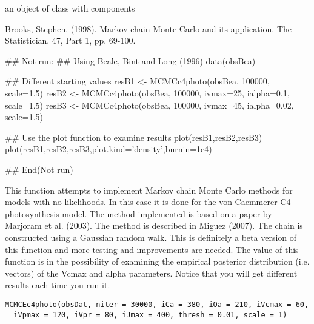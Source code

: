 \documentclass[letterpaper]{book}
\begin{document}
%
\begin{Value}
an object of class  with components
\end{Value}
%
\begin{References}\relax
Brooks, Stephen. (1998). Markov chain Monte Carlo and its
application. The Statistician. 47, Part 1, pp. 69-100.
\end{References}
%
\begin{Examples}
\begin{ExampleCode}
## Not run: 
## Using Beale, Bint and Long (1996)
data(obsBea)

## Different starting values
resB1 <- MCMCc4photo(obsBea, 100000, scale=1.5)
resB2 <- MCMCc4photo(obsBea, 100000, ivmax=25, ialpha=0.1, scale=1.5)
resB3 <- MCMCc4photo(obsBea, 100000, ivmax=45, ialpha=0.02, scale=1.5)

## Use the plot function to examine results
plot(resB1,resB2,resB3)
plot(resB1,resB2,resB3,plot.kind='density',burnin=1e4)


## End(Not run)
\end{ExampleCode}
\end{Examples}
%
\begin{Description}\relax
This function attempts to implement Markov chain Monte
Carlo methods for models with no likelihoods. In this case
it is done for the von Caemmerer C4 photosynthesis model.
The method implemented is based on a paper by Marjoram et
al. (2003).  The method is described in Miguez (2007). The
chain is constructed using a Gaussian random walk. This is
definitely a beta version of this function and more testing
and improvements are needed. The value of this function is
in the possibility of examining the empirical posterior
distribution (i.e. vectors) of the Vcmax and alpha
parameters. Notice that you will get different results each
time you run it.
\end{Description}
%
\begin{Usage}
\begin{verbatim}
MCMCEc4photo(obsDat, niter = 30000, iCa = 380, iOa = 210, iVcmax = 60,
  iVpmax = 120, iVpr = 80, iJmax = 400, thresh = 0.01, scale = 1)
\end{verbatim}
\end{Usage}
%
\end{document}
